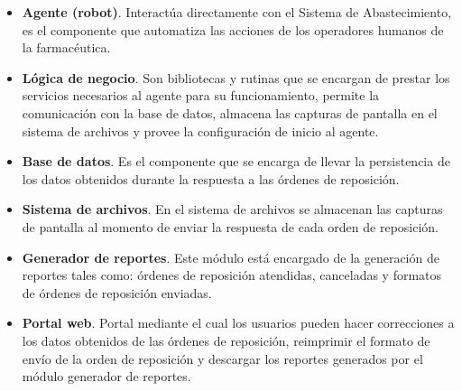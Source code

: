 \documentclass[letterpaper,11pt]{article}
\begin{document}
\begin{itemize}
\item \textbf{Agente (robot)}. Interactúa directamente con el Sistema de Abastecimiento, es el componente que automatiza las acciones de los operadores humanos de la farmacéutica.
\item \textbf{Lógica de negocio}. Son bibliotecas y rutinas que se encargan de prestar los servicios necesarios al agente para su funcionamiento, permite la comunicación con la base de datos, almacena las capturas de pantalla en el sistema de archivos y provee la configuración de inicio al agente.
\item \textbf{Base de datos}. Es el componente que se encarga de llevar la persistencia de los datos obtenidos durante la respuesta a las órdenes de reposición.
\item \textbf{Sistema de archivos}. En el sistema de archivos se almacenan las capturas de pantalla al momento de enviar la respuesta de cada orden de reposición.
\item \textbf{Generador de reportes}. Este módulo está encargado de la generación de reportes tales como: órdenes de reposición atendidas, canceladas y formatos de órdenes de reposición enviadas.
\item \textbf{Portal web}. Portal mediante el cual los usuarios pueden hacer correcciones a los datos obtenidos de las órdenes de reposición, reimprimir el formato de envío de la orden de reposición  y descargar los reportes generados por el módulo generador de reportes.
\end{itemize}
\end{document}
